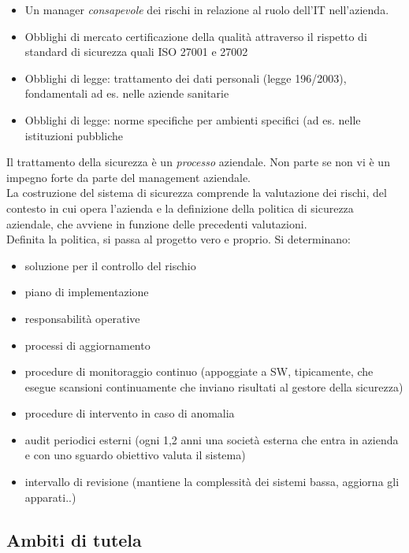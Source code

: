 \begin{itemize}

\item
  Un manager \emph{consapevole} dei rischi in relazione al ruolo dell'IT
  nell'azienda.\\
\item
  Obblighi di mercato certificazione della qualit\`a attraverso il
  rispetto di standard di sicurezza quali ISO 27001 e 27002
\item
  Obblighi di legge: trattamento dei dati personali (legge 196/2003),
  fondamentali ad es. nelle aziende sanitarie
\item
  Obblighi di legge: norme specifiche per ambienti specifici (ad es.
  nelle istituzioni pubbliche
\end{itemize}

Il trattamento della sicurezza \`e un \emph{processo} aziendale. Non parte
se non vi \`e un impegno forte da parte del management aziendale.\\
La costruzione del sistema di sicurezza comprende la valutazione dei
rischi, del contesto in cui opera l'azienda e la definizione della
politica di sicurezza aziendale, che avviene in funzione delle
precedenti valutazioni.\\
Definita la politica, si passa al progetto vero e proprio. Si
determinano:

\begin{itemize}

\item
  soluzione per il controllo del rischio
\item
  piano di implementazione
\item
  responsabilit\`a operative
\item
  processi di aggiornamento
\item
  procedure di monitoraggio continuo (appoggiate a SW, tipicamente, che
  esegue scansioni continuamente che inviano risultati al gestore della
  sicurezza)
\item
  procedure di intervento in caso di anomalia
\item
  audit periodici esterni (ogni 1,2 anni una societ\`a esterna che entra
  in azienda e con uno sguardo obiettivo valuta il sistema)
\item
  intervallo di revisione (mantiene la complessit\`a dei sistemi bassa,
  aggiorna gli apparati..)
\end{itemize}

\subsection{Ambiti di tutela}

